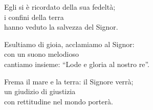 

\spazio

\strofa Egli si è ricordato della sua fedeltà;\\
i confini della terra\\
hanno veduto la salvezza del Signor.

\spazio


\spazio

\strofa Esultiamo di gioia, acclamiamo al Signor:\\
con un suono melodioso\\
cantiamo insieme: ``Lode e gloria al nostro re''.

\spazio


\spazio

\strofa Frema il mare e la terra: il Signore verrà;\\
un giudizio di giustizia\\
con rettitudine nel mondo porterà.

\spazio

